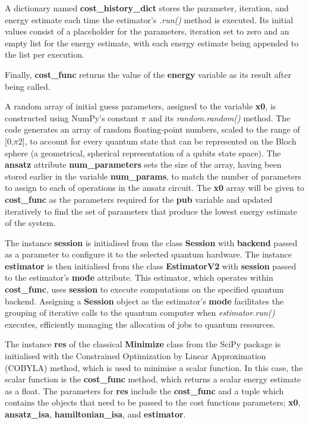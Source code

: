 \documentclass{article}
\begin{document}
{A dictionary named \textbf{cost\_history\_dict} stores the parameter, iteration, and energy estimate each time the estimator's \textit{.run()} method is executed. Its initial values consist of a placeholder for the parameters, iteration set to zero and an empty list for the energy estimate, with each energy estimate being appended to the list per execution. 

Finally, \textbf{cost\_func} returns the value of the \textbf{energy} variable as its result after being called.

A random array of initial guess parameters, assigned to the variable \textbf{x0}, is constructed using NumPy’s constant $\pi$ and its \textit{random.random()} method. The code generates an array of random floating-point numbers, scaled to the range of [0,$\pi$2], to account for every quantum state that can be represented on the Bloch sphere (a geometrical, spherical representation of a qubits state space\cite{blocsphere}). The \textbf{ansatz} attribute \textbf{num\_parameters} sets the size of the array, having been stored earlier in the variable \textbf{num\_params}, to match the number of parameters to assign to each of operations in the ansatz circuit. The \textbf{x0} array will be given to \textbf{cost\_func} as the parameters required for the \textbf{pub} variable and updated iteratively to find the set of parameters that produce the lowest energy estimate of the system.

The instance \textbf{session} is initialised from the class \textbf{Session} with \textbf{backend} passed as a parameter to configure it to the selected quantum hardware. The instance \textbf{estimator} is then initialised from the class \textbf{EstimatorV2} with \textbf{session} passed to the estimator's \textbf{mode} attribute. This estimator, which operates within \textbf{cost\_func}, uses \textbf{session} to execute computations on the specified quantum backend. Assigning a  \textbf{Session} object as the estimator's \textbf{mode} facilitates the grouping of iterative calls to the quantum computer when \textit{estimator.run()} executes, efficiently managing the allocation of jobs to quantum resources\cite{Session}.

The instance \textbf{res} of the classical \textbf{Minimize} class from the SciPy package is initialised with the Constrained Optimization by Linear Approximation (COBYLA) method, which is used to minimise a scalar function\cite{Minimize}. In this case, the scalar function is the \textbf{cost\_func} method, which returns a scalar energy estimate as a float. The parameters for \textbf{res} include the \textbf{cost\_func} and a tuple which contains the objects that need to be passed to the cost functions parameters; \textbf{x0}, \textbf{ansatz\_isa}, \textbf{hamiltonian\_isa}, and \textbf{estimator}.

}
\end{document}
